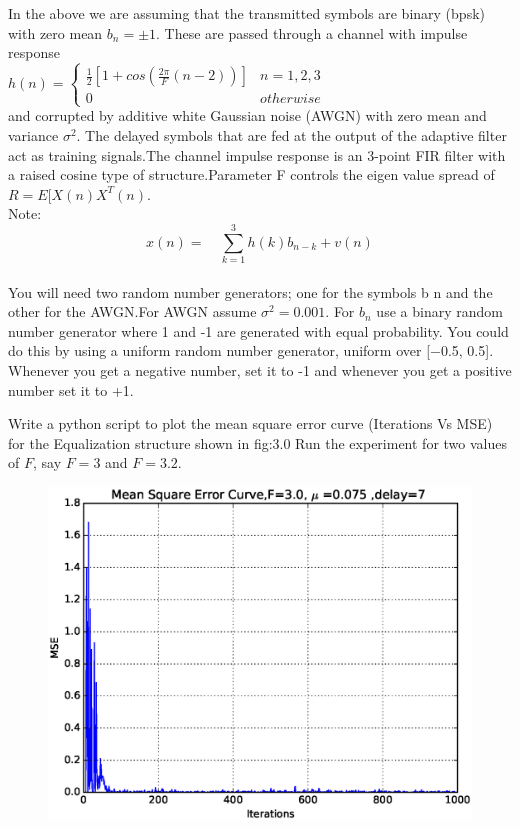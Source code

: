 \documentclass[journal,12pt,twocolumn]{IEEEtran}
\begin{document}
\bigskip
In the above we are assuming that the transmitted symbols are binary (bpsk) with zero mean $b_n=\pm 1$. These are passed through a channel with impulse response\\
\medskip
$h(n)=\begin{cases}
\frac{1}{2}[1+cos(\frac{2\pi}{F}{(n-2)})]& n=1,2,3\\
0 & otherwise
\end{cases}$\\
\medskip
and corrupted by additive white Gaussian noise (AWGN) with zero mean and variance $\sigma^2$. The delayed symbols that are fed at the output of the adaptive filter act as training signals.The channel impulse response is an 3-point FIR filter with a raised cosine type of structure.Parameter F controls the eigen value spread of $R=E[X(n)X^T(n)$.\\
\medskip
Note:\\ 
$$x(n)=\quad\sum_{k=1}^{3}h(k)b_{n-k}+v(n)$$\\
\medskip
You will need two random number generators; one for the symbols b n and the other for the AWGN.For AWGN assume $\sigma^2=0.001.$ For $b_n$ use a binary random number generator where 1 and -1 are generated with equal probability. You could do this by using a uniform random number generator, uniform over [−0.5, 0.5]. Whenever you get a negative number, set it to -1 and whenever you get a positive number set it to +1.
\medskip
\begin{problem}
Write a python script to plot the mean square error curve (Iterations Vs MSE) for the Equalization structure shown in fig:3.0
Run the experiment for two values of $F$, say $F=3$ and $F=3.2$. \label{prob3.1}
\end{problem}
\solution
	  
\begin{figure}[h]
	\includegraphics[width=1\linewidth]{Learning_curve.eps}
	
	\label{}
	\caption{}
\label{fig:f3}

\end{figure}
\end{document}
